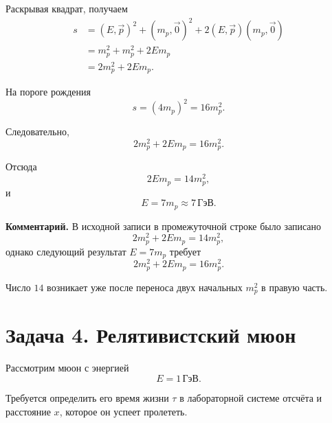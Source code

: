 \documentclass[../final.tex]{subfiles}
\begin{document}
Раскрывая квадрат, получаем
%
\begin{align*}
    s
    &=
    (E,\vec p)^2
    +
    (m_p,\vec 0)^2
    +
    2(E,\vec p)(m_p,\vec 0)
    \\[3pt]
    &=
    m_p^2
    +
    m_p^2
    +
    2Em_p
    \\[3pt]
    &=
    2m_p^2+2Em_p.
\end{align*}

На пороге рождения
%
\begin{equation*}
    s
    =
    (4m_p)^2
    =
    16m_p^2.
\end{equation*}

Следовательно,
%
\begin{equation*}
    2m_p^2+2Em_p
    =
    16m_p^2.
\end{equation*}

Отсюда
%
\begin{equation*}
    2Em_p
    =
    14m_p^2,
\end{equation*}
%
и
%
\begin{equation*}
    E
    =
    7m_p
    \approx
    7\,\text{ГэВ}.
\end{equation*}

\textbf{Комментарий.}
В исходной записи в промежуточной строке было записано
%
\begin{equation*}
    2m_p^2+2Em_p
    =
    14m_p^2,
\end{equation*}
%
однако следующий результат $E=7m_p$ требует
%
\begin{equation*}
    2m_p^2+2Em_p
    =
    16m_p^2.
\end{equation*}

Число $14$ возникает уже после переноса двух начальных
$m_p^2$ в правую часть.



\newpage
\section{Задача 4. Релятивистский мюон}

Рассмотрим мюон с энергией
%
\begin{equation*}
    E
    =
    1\,\text{ГэВ}.
\end{equation*}

Требуется определить его время жизни $\tau$ в лабораторной системе
отсчёта и расстояние $x$, которое он успеет пролететь.
\end{document}
